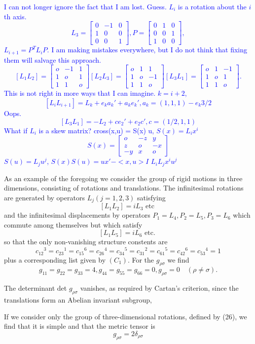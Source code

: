 \textcolor{blue}{
I can not longer ignore the fact that I am lost.
Guess.  \(L_i\) is a rotation about the \(i\)th axis. 
\[
L_3= \begin{bmatrix}
0 & -1 & 0 \\
1 & 0  & 0\\
0 & 0  & 1
\end{bmatrix},
P = \begin{bmatrix}
0 & 1 & 0 \\
0 & 0 & 1\\
1 & 0 & 0
\end{bmatrix},
\]
\(L_{i+1}=P^T L_i P\).  I am making mistakes everywhere, but
I do not think that fixing them will salvage this approach.
\[
[L_1 L_2] = \begin{bmatrix}
o & -1 & 1 \\
1 & o  & 1 \\
1 & 1  & o 
\end{bmatrix}
[L_2 L_3] = \begin{bmatrix}
o & 1 & 1 \\
1 & o  & -1 \\
1 & 1  & o 
\end{bmatrix}
[L_3 L_1] = \begin{bmatrix}
o & 1 & -1 \\
1 & o  & 1 \\
1 & 1  & o 
\end{bmatrix}.
\]
This is not right in more ways that I can imagine.  \(k=i+2\),
\[
[L_i L_{i+1}] = L_{k} + e_k a_k' + a_k e_k',  a_k= (1,1,1) - e_k 3/2
\]
Oops.
\[
[L_3 L_1] = -L_2 +c e_2' + e_2 c', c=(1/2,1,1)
\]
What if \(L_i\) is a skew matrix?
cross(x,u) = S(x) u, \(S(x) = L_i x^{i}\)
\[
S(x) = 
\begin{bmatrix}
 o &-z & y\\
 z & o &-x\\
-y & x & o
\end{bmatrix}
\]
\(S(u)=L_j u^{j}\), \(S(x)S(u) = u x' - <x,u> I\)
\( L_i L_j x^i  u^j\)
}

As an example of the foregoing we consider the group of rigid motions in three
dimensions, consisting of rotations and translations. The infinitesimal
rotations are generated by operators \(L_j(j=1,2,3)\) satisfying
\[
\left[L_1 L_2\right]=i L_3 \text { etc }
\]
and the infinitesimal displacements by operators \(P_1=L_4, P_2=L_5, P_3=L_6\) which commute among themselves but which satisfy
\[
\left[L_1 L_5\right]=i L_6 \text { etc. }
\]
so that the only non-vanishing structure constents are
\[
c_{12}{ }^3=c_{23}{ }^1=c_{15}{ }^6=c_{26}{ }^4=c_{34}{ }^5=c_{31}{ }^2=c_{61}{ }^5=c_{42}{ }^6=c_{53}{ }^4=1
\]
plus a corresponding list given by \(\left(C_1\right)\). For the \(g_{\rho \sigma}\) we find
\[
g_{11}=g_{22}=g_{33}=4, g_{44}=g_{55}=g_{66}=0, g_{\rho \sigma}=0 \quad(\rho \neq \sigma) .
\]

The determinant det \(g_{\rho \sigma}\) vanishes, as required by Cartan's
criterion, since the translations form an Abelian invariant subgroup,

If we consider only the group of three-dimensional rotations, defined by (26),
we find that it is simple and that the metric tensor is
\[
g_{\rho \sigma}=2 \delta_{\rho \sigma}
\]

